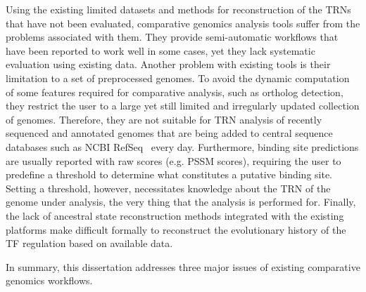Using the existing limited datasets and methods for reconstruction of the TRNs
that have not been evaluated, comparative genomics analysis tools suffer from
the problems associated with them. They provide semi-automatic workflows that
have been reported to work well in some cases, yet they lack systematic
evaluation using existing data. Another problem with existing tools is their
limitation to a set of preprocessed genomes. To avoid the dynamic computation
of some features required for comparative analysis, such as ortholog detection,
they restrict the user to a large yet still limited and irregularly updated
collection of genomes. Therefore, they are not suitable for TRN analysis of
recently sequenced and annotated genomes that are being added to central
sequence databases such as NCBI RefSeq~\citep{o2015reference} every
day. Furthermore, binding site predictions are usually reported with raw scores
(e.g. PSSM scores), requiring the user to predefine a threshold to determine
what constitutes a putative binding site. Setting a threshold, however,
necessitates knowledge about the TRN of the genome under analysis, the very
thing that the analysis is performed for. Finally, the lack of ancestral state
reconstruction methods integrated with the existing platforms make difficult
formally to reconstruct the evolutionary history of the TF regulation based on
available data.

In summary, this dissertation addresses three major issues of existing
comparative genomics workflows.

